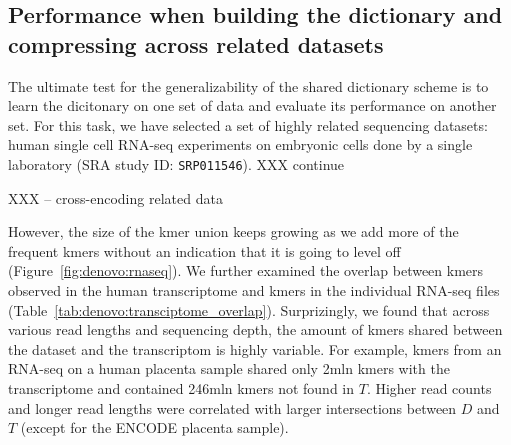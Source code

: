 \documentclass[12pt]{cmuthesis}
\begin{document}



  \subsection{Performance when building the dictionary and compressing across related datasets}

    The ultimate test for the generalizability of the shared dictionary scheme is to learn the dicitonary on one set of data and evaluate its performance on another set. For this task, we have selected a set of highly related sequencing datasets: human single cell RNA-seq experiments on embryonic cells done by a single laboratory (SRA study ID: \texttt{SRP011546}). XXX continue


    XXX -- cross-encoding related data








    However, the size of the kmer union keeps growing as we add more of the frequent kmers without an indication that it is going to level off (Figure~\ref{fig:denovo:rnaseq}). We further examined the overlap between kmers observed in the human transcriptome and kmers in the individual RNA-seq files (Table~\ref{tab:denovo:transciptome_overlap}). Surprizingly, we found that across various read lengths and sequencing depth, the amount of kmers shared between the dataset and the transcriptom is highly variable. For example, kmers from an RNA-seq on a human placenta sample shared only 2mln kmers with the transcriptome and contained 246mln kmers not found in $T$. Higher read counts and longer read lengths were correlated with larger intersections between $D$ and $T$ (except for the ENCODE placenta sample).

    

\end{document}
